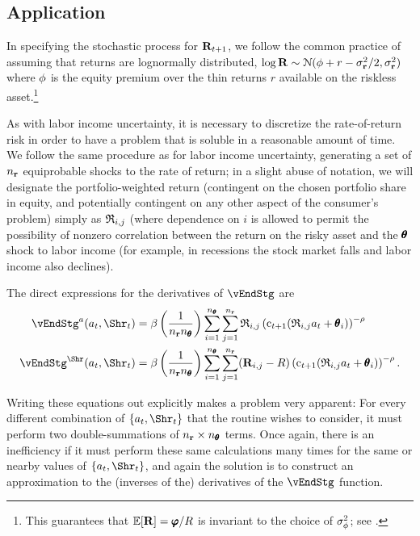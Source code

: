 \documentclass[titlepage, headings=optiontotocandhead]{Resources/texmf-local/tex/latex/econtex}
\begin{document}
\subsection{Application}\label{subsec:MCApplication}


In specifying the stochastic process for ${\mathbf{R}}_{t+1}$, we follow the common practice of assuming that returns are lognormally distributed, $\log {\mathbf{R}} \sim \mathcal{N}(\phi+r-\sigma^{2}_{{\mathbf{r}}}/2,\sigma^{2}_{{\mathbf{r}}})$ where $\phi$ is the equity premium over the thin returns $r$ available on the riskless asset.\footnote{This guarantees that $\operatorname{\mathbb{E}}[{\mathbf{R}}] = \pmb{\varphi}/R$ is invariant to the choice of $\sigma^{2}_{\phi}$; see .}

As with labor income uncertainty, it is necessary to discretize the rate-of-return risk in order to have a problem that is soluble in a reasonable amount of time.  We follow the same procedure as for labor income uncertainty, generating a set of $n_{{\mathbf{r}}}$ equiprobable shocks to the rate of return; in a slight abuse of notation, we will designate the portfolio-weighted return (contingent on the chosen portfolio share in equity, and potentially contingent on any other aspect of the consumer's problem) simply as $\mathfrak{R}_{i,j}$ (where dependence on $i$ is allowed to permit the possibility of nonzero correlation between the return on the risky asset and the $\pmb{\theta}$ shock to labor income (for example, in recessions the stock market falls and labor income also declines).

The direct expressions for the derivatives of $\vEndStg$ are
\begin{equation}\begin{gathered}\begin{aligned}
      \vEndStg^{a}(a_{t},\Shr_{t})  & = \beta \left(\frac{1}{n_{\risky} n_{\TranShkEmp}}\right)\sum_{i=1}^{n_{\TranShkEmp}}\sum_{j=1}^{n_{\risky} }\Rport_{i,j} \left(\cFunc_{t+1}(\Rport_{i,j}a_{t}+\TranShkEmp_{i})\right)^{-\rho}
      \\      \vEndStg^{\Shr}(a_{t},\Shr_{t})  & = \beta \left(\frac{1}{n_{\risky} n_{\TranShkEmp}}\right)\sum_{i=1}^{n_{\TranShkEmp}}\sum_{j=1}^{n_{\risky} }(\Risky_{i,j}-R)\left(\cFunc_{t+1}(\Rport_{i,j}a_{t}+\TranShkEmp_{i})\right)^{-\rho}.
    \end{aligned}\end{gathered}\end{equation}

Writing these equations out explicitly makes a problem very apparent: For every different combination of $\{{a}_{t},\Shr_{t}\}$ that the routine wishes to consider, it must perform two double-summations of $n_{{\mathbf{r}}} \times n_{\pmb{\theta}}$ terms.  Once again, there is an inefficiency if it must perform these same calculations many times for the same or nearby values of $\{{a}_{t},\Shr_{t}\}$, and again the solution is to construct an approximation to the (inverses of the) derivatives of the $\vEndStg$ function.
\end{document}
